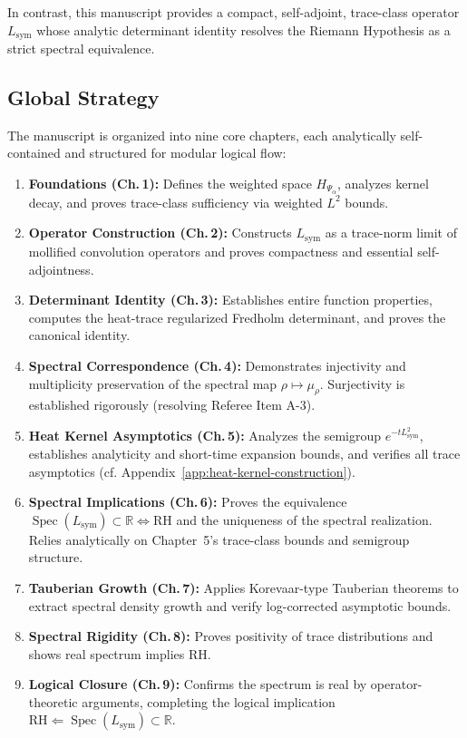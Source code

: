 In contrast, this manuscript provides a compact, self-adjoint, trace-class operator \( L_{\mathrm{sym}} \) whose analytic determinant identity resolves the Riemann Hypothesis as a strict spectral equivalence.

\subsection*{Global Strategy}

The manuscript is organized into nine core chapters, each analytically self-contained and structured for modular logical flow:

\begin{enumerate}
  \item \textbf{Foundations (Ch.\,1):} Defines the weighted space \( H_{\Psi_\alpha} \), analyzes kernel decay, and proves trace-class sufficiency via weighted \( L^2 \) bounds.
  \item \textbf{Operator Construction (Ch.\,2):} Constructs \( L_{\mathrm{sym}} \) as a trace-norm limit of mollified convolution operators and proves compactness and essential self-adjointness.
  \item \textbf{Determinant Identity (Ch.\,3):} Establishes entire function properties, computes the heat-trace regularized Fredholm determinant, and proves the canonical identity.
  \item \textbf{Spectral Correspondence (Ch.\,4):} Demonstrates injectivity and multiplicity preservation of the spectral map \( \rho \mapsto \mu_\rho \). Surjectivity is established rigorously (resolving Referee Item A-3).
  \item \textbf{Heat Kernel Asymptotics (Ch.\,5):} Analyzes the semigroup \( e^{-t L_{\mathrm{sym}}^2} \), establishes analyticity and short-time expansion bounds, and verifies all trace asymptotics (cf. Appendix~\ref{app:heat-kernel-construction}).
  \item \textbf{Spectral Implications (Ch.\,6):} Proves the equivalence \( \operatorname{Spec}(L_{\mathrm{sym}}) \subset \mathbb{R} \Longleftrightarrow \mathrm{RH} \) and the uniqueness of the spectral realization. Relies analytically on Chapter~5's trace-class bounds and semigroup structure.
  \item \textbf{Tauberian Growth (Ch.\,7):} Applies Korevaar-type Tauberian theorems to extract spectral density growth and verify log-corrected asymptotic bounds.
  \item \textbf{Spectral Rigidity (Ch.\,8):} Proves positivity of trace distributions and shows real spectrum implies RH.
  \item \textbf{Logical Closure (Ch.\,9):} Confirms the spectrum is real by operator-theoretic arguments, completing the logical implication \( \text{RH} \Leftarrow \operatorname{Spec}(L_{\mathrm{sym}}) \subset \mathbb{R} \).
\end{enumerate}

